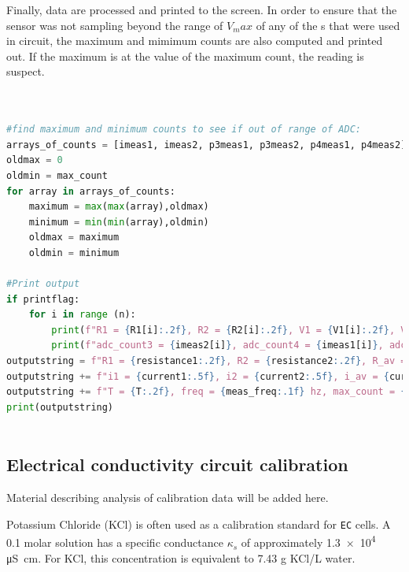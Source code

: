 {\begin{lstlisting}[language=Python]
\end{lstlisting}

Finally, data are processed and printed to the screen. In order to ensure that the sensor was not sampling beyond the range of $V_max$ of any of the \adc s that were used in circuit, the maximum and mimimum \adc counts are also computed and printed out.  If the maximum is at the value of the maximum count, the reading is suspect.

\begin{lstlisting}[language=Python]

    
#find maximum and minimum counts to see if out of range of ADC:
arrays_of_counts = [imeas1, imeas2, p3meas1, p3meas2, p4meas1, p4meas2]
oldmax = 0
oldmin = max_count
for array in arrays_of_counts:
    maximum = max(max(array),oldmax)
    minimum = min(min(array),oldmin)
    oldmax = maximum
    oldmin = minimum

#Print output
if printflag:
    for i in range (n):
        print(f"R1 = {R1[i]:.2f}, R2 = {R2[i]:.2f}, V1 = {V1[i]:.2f}, V2 = {V2[i]:.2f}, i1 = {i1[i]:.2f}, i2 = {i2[i]:.2f}")
        print(f"adc_count3 = {imeas2[i]}, adc_count4 = {imeas1[i]}, adc1_1 = {p3meas1[i]}, acd1_2 = {p4meas1[i]}, adc2_1 = {p4meas1[i]}, adc2_2 = {p4meas2[i]}")
outputstring = f"R1 = {resistance1:.2f}, R2 = {resistance2:.2f}, R_av = {resistance_average:.2f}, "
outputstring += f"i1 = {current1:.5f}, i2 = {current2:.5f}, i_av = {current_average:.5f}, "
outputstring += f"T = {T:.2f}, freq = {meas_freq:.1f} hz, max_count = {maximum}, min_count = {minimum}"
print(outputstring)
    
\end{lstlisting}


\subsection{\color{gray}Electrical conductivity circuit calibration \color{black}}

\color{gray}Material describing analysis of calibration data will be added here.\color{black}



\begin{kaobox}[frametitle=Mixing up an \texttt{EC} calibration fluid]
Potassium Chloride (KCl) is often used as a calibration standard for \texttt{EC} cells. A 0.1 molar solution has a specific conductance $\kappa_s$ of approximately \num{1.3e4} \si{\micro\siemens\cm}. For KCl, this concentration is equivalent to 7.43 g KCl/L water.
\end{kaobox}


}
